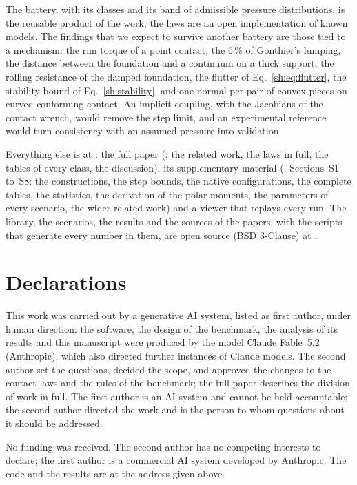 The battery, with its classes and its band of admissible pressure distributions, is the
reusable product of the work; the laws are an open implementation of known models. The findings that we expect to survive another battery are those tied to a
mechanism: the rim torque of a point contact, the 6\,\% of Gonthier's lumping, the distance
between the foundation and a continuum on a thick support, the rolling resistance of the
damped foundation, the flutter of Eq.~\eqref{sh:eq:flutter}, the stability bound of
Eq.~\eqref{sh:stability}, and one normal per pair of convex pieces on curved conforming
contact. An implicit coupling, with the Jacobians of the contact
wrench, would remove the step limit, and an experimental reference would turn consistency with
an assumed pressure into validation.

Everything else is at : the full paper
(: the related work, the laws in full, the tables of every class, the
discussion), its supplementary material (, Sections~S1 to~S8: the
constructions, the step bounds, the native configurations, the complete tables, the statistics,
the derivation of the polar moments, the parameters of every scenario, the wider related work) and a viewer that replays every run. The library, the scenarios, the results and the sources of the papers, with the
scripts that generate every number in them, are open source (BSD 3-Clause) at
.

\backmatter

\section*{Declarations}

This work was carried out by a generative AI system, listed as first author, under human
direction: the software, the design of the benchmark, the analysis of its results and this
manuscript were produced by the model Claude Fable~5.2 (Anthropic), which also directed
further instances of Claude models. The
second author set the questions, decided the scope, and approved the changes to the contact
laws and the rules of the benchmark; the full paper describes the division
of work in full. The first author is an AI system and cannot be held accountable; the second
author directed the work and is the person to whom questions about it should be addressed.

No funding was received. The second author has no competing interests to declare; the first
author is a commercial AI system developed by Anthropic. The code and the results are at the address given above.
